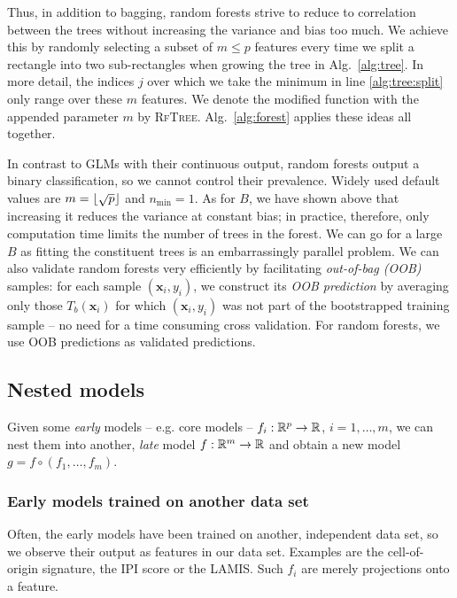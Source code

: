 Thus, in addition to bagging, random forests strive to reduce to correlation between the trees 
without increasing the variance and bias too much. We achieve this by randomly selecting a subset
of $m \leq p$ features every time we split a rectangle into two sub-rectangles when growing the 
tree in Alg.\ \ref{alg:tree}. In more detail, the indices $j$ over which we take the minimum in 
line \ref{alg:tree:split} only range over 
these $m$ features. We denote the modified function with the appended parameter $m$ by 
\textsc{RfTree}. Alg.\ \ref{alg:forest} applies these ideas all together.



In contrast to GLMs with their continuous output, random forests output a binary classification,
so we cannot control their prevalence. Widely used default values are $m = \lfloor\sqrt{p}\rfloor$ and 
$n_\text{min} = 1$. As for $B$, we have 
shown above that increasing it reduces the variance at constant bias; in practice, therefore, only 
computation time limits the number of trees in the forest. We can go for a large $B$ as fitting the 
constituent trees is an embarrassingly parallel problem. We can 
also validate random forests very efficiently by facilitating \textit{out-of-bag (OOB)} samples: 
for each sample $(\mathbf{x}_i, y_i)$, we construct its \textit{OOB prediction} by averaging only 
those $T_b(\mathbf{x}_i)$ for which $(\mathbf{x}_i, y_i)$ was not part of the bootstrapped training 
sample -- no need for a time consuming cross validation. For random forests, we use OOB predictions 
as validated predictions.

\subsection{Nested models}\label{subsec:nested-models}

Given some \textit{early} models -- e.g. core models -- $f_i: \mathbb{R}^p \to \mathbb{R}$, $i = 1, \ldots, m$, 
we can nest them into another, \textit{late} model $f: \mathbb{R}^m \to \mathbb{R}$ and obtain a new model 
$g = f \circ (f_1, \ldots, f_m)$. 

\subsubsection{Early models trained on another data set}
Often, the early models have been trained on another, independent data set, so we observe their 
output as features in our data set. Examples are the cell-of-origin signature, the IPI score or the 
LAMIS. Such $f_i$ are merely projections onto a feature.


